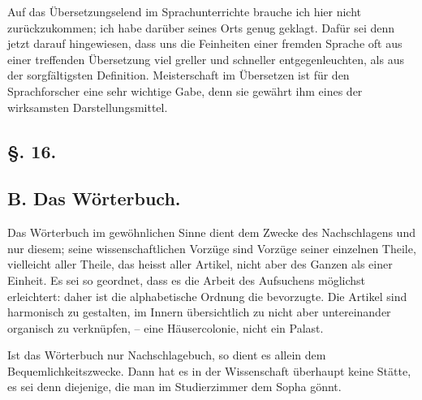 \label{fp.128}

Auf das Übersetzungselend im Sprachunterrichte brauche ich hier nicht zurückzukommen; ich habe darüber seines Orts genug geklagt. Dafür sei denn \label{sp.121} jetzt darauf hingewiesen, dass uns die Feinheiten einer fremden Sprache oft aus einer treffenden Übersetzung viel greller und schneller entgegenleuchten, als aus der sorgfältigsten Definition. Meisterschaft im Übersetzen ist für den Sprachforscher eine sehr wichtige Gabe, denn sie gewährt ihm eines der wirksamsten Darstellungsmittel.

\subsection*{§. 16.}\label{II.VI.16}
\subsection*{B. Das Wörterbuch.}

Das Wörterbuch im gewöhnlichen Sinne dient dem Zwecke des Nachschlagens und nur diesem; seine wissenschaftlichen Vorzüge sind Vorzüge seiner einzelnen Theile, vielleicht aller Theile, das heisst aller Artikel, nicht aber des Ganzen als einer Einheit. Es sei so geordnet, dass es die Arbeit des Aufsuchens möglichst erleichtert: daher ist die alphabetische Ordnung die bevorzugte. Die Artikel sind harmonisch zu gestalten, im Innern übersichtlich zu  nicht aber untereinander organisch zu verknüpfen, – eine Häusercolonie, nicht ein Palast.

Ist das Wörterbuch nur Nachschlagebuch, so dient es allein dem Bequemlichkeitszwecke. Dann hat es in der Wissenschaft überhaupt keine Stätte, es sei denn diejenige, die man im Studierzimmer dem Sopha gönnt.
 


